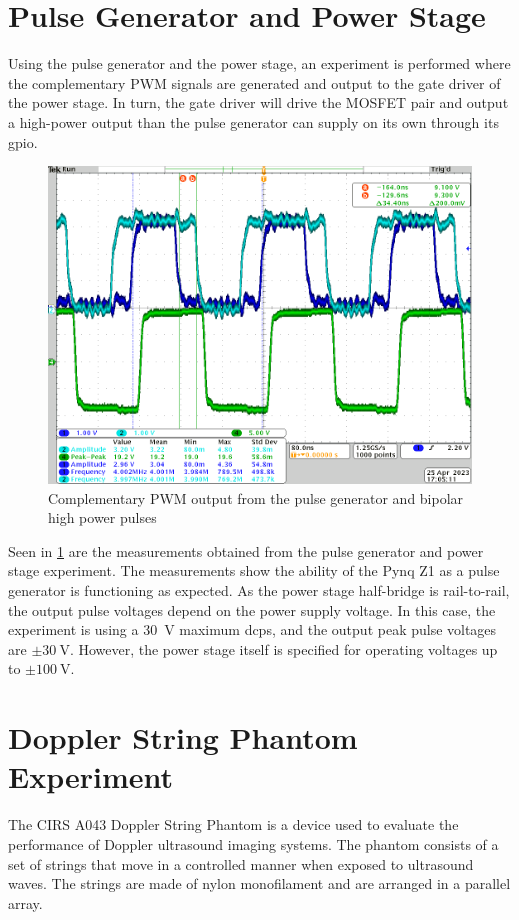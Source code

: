 \section{Pulse Generator and Power Stage}
Using the pulse generator and the power stage, an experiment is performed where the complementary PWM signals are generated and output to the gate driver of the power stage. In turn, the gate driver will drive the MOSFET pair and output a high-power output than the pulse generator can supply on its own through its \gls{gpio}.

\begin{figure}[htbp]
	\centering
	\includegraphics[width=.8\textwidth]{Figures/5_controlsystem_fpga_pwm.png}
	\caption{Complementary PWM output from the pulse generator and bipolar high power pulses}
	\label{fig:5_pulse_generator_experiment}
\end{figure}

Seen in \cref{fig:5_pulse_generator_experiment} are the measurements obtained from the pulse generator and power stage experiment. The measurements show the ability of the Pynq Z1 as a pulse generator is functioning as expected. As the power stage half-bridge is rail-to-rail, the output pulse voltages depend on the power supply voltage. In this case, the experiment is using a \qty{30}{\volt} maximum \gls{dcps}, and the output peak pulse voltages are $\pm \qty{30}{\volt}$. However, the power stage itself is specified for operating voltages up to $\pm \qty{100}{\volt}$.

\section{Doppler String Phantom Experiment}
The CIRS A043 Doppler String Phantom is a device used to evaluate the performance of Doppler ultrasound imaging systems. The phantom consists of a set of strings that move in a controlled manner when exposed to ultrasound waves. The strings are made of nylon monofilament and are arranged in a parallel array.

